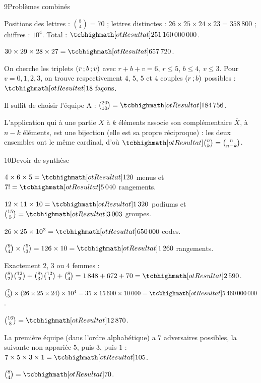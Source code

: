\begin{corrige}{9}{Problèmes combinés}
\begin{questions}
  \item Positions des lettres : $\binom84=70$ ; lettres distinctes : $26\times25\times24\times23=358\,800$ ; chiffres : $10^{4}$.
    Total : $\res{251\,160\,000\,000}$.
  \item $30\times29\times28\times27=\res{657\,720}$.
  \item On cherche les triplets $(r\,{;}\, b\,{;}\, v)$ avec $r+b+v=6$, $r\leq5$, $b\leq4$, $v\leq3$. Pour $v=0,1,2,3$, on trouve
    respectivement $4$, $5$, $5$ et $4$ couples $(r\,{;}\, b)$ possibles : $\res{18\text{ façons}}$.
  \item Il suffit de choisir l'équipe A : $\binom{20}{10}=\res{184\,756}$.
  \item L'application qui à une partie $X$ à $k$ éléments associe son complémentaire $\overline X$, à $n-k$ éléments, est une
    bijection (elle est sa propre réciproque) : les deux ensembles ont le même cardinal, d'où $\res{\binom nk=\binom n{n-k}}$.
\end{questions}
\end{corrige}

\begin{corrige}{10}{Devoir de synthèse}
\begin{questions}
  \item $4\times6\times5=\res{120}$ menus et $7!=\res{5\,040}$ rangements.
  \item $12\times11\times10=\res{1\,320}$ podiums et $\binom{15}{5}=\res{3\,003}$ groupes.
  \item $26\times25\times10^{3}=\res{650\,000}$ codes.
  \item $\binom94\times\binom53=126\times10=\res{1\,260}$ rangements.
  \item Exactement $2$, $3$ ou $4$ femmes : $\binom82\binom{12}2+\binom83\binom{12}1+\binom84=1\,848+672+70=\res{2\,590}$.
  \item $\binom73\times(26\times25\times24)\times10^{4}=35\times15\,600\times10\,000=\res{5\,460\,000\,000}$.
  \item $\binom{16}{8}=\res{12\,870}$.
  \item La première équipe (dans l'ordre alphabétique) a $7$ adversaires possibles, la suivante non appariée $5$, puis $3$, puis $1$ :
    $7\times5\times3\times1=\res{105}$.
  \item $\binom84=\res{70}$.
\end{questions}
\end{corrige}

